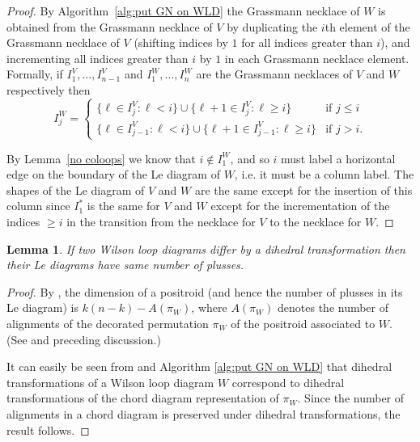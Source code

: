 \documentclass[11pt]{article}
\newtheorem{lem}[thm]{Lemma}
\theoremstyle{remark}
\theoremstyle{definition}
\begin{document}
\begin{proof}
  By Algorithm~\ref{alg:put GN on WLD} the Grassmann necklace of $W$ is obtained from the Grassmann necklace of $V$ by duplicating the $i$th element of the Grassmann necklace of $V$ (shifting indices by $1$ for all indices greater than $i$), and incrementing all indices greater than $i$ by $1$ in each Grassmann necklace element.  Formally, if $I_1^{V}, \ldots, I_{n-1}^{V}$ and $I_1^{W}, \ldots, I_n^{W}$ are the Grassmann necklaces of $V$ and $W$ respectively then
  \[
  I_j^{W} =
  \begin{cases}
    \{\ell \in I_j^{V} : \ell < i\} \cup \{\ell+1 \in I_j^{V} : \ell \geq i\} & \text{if $j\leq i$} \\
    \{\ell \in I_{j-1}^{V} : \ell < i\} \cup \{\ell+1 \in I_{j-1}^{V} : \ell \geq i\} & \text{if $j > i$.}
  \end{cases}
  \]


By Lemma~\ref{no coloops} we know that $i \not\in I_1^W$, and so $i$ must label a horizontal edge on the boundary of the Le diagram of $W$, i.e. it must be a column label. The shapes of the Le diagram of $V$ and $W$ are the same except for the insertion of this column since $I_1^*$ is the same for $V$ and $W$ except for the incrementation of the indices $\geq i$ in the transition from the necklace for $V$ to the necklace for $W$. 
\end{proof}


\begin{lem}\label{lem dihedral}
If two Wilson loop diagrams differ by a dihedral transformation then their Le diagrams have same number of plusses.
\end{lem}
\begin{proof}
By \cite[Proposition 17.10]{Postnikov}, the dimension of a positroid (and hence the number of plusses in its Le diagram) is $k(n-k) - A(\pi_W)$, where $A(\pi_W)$ denotes the number of alignments of the decorated permutation $\pi_W$ of the positroid associated to $W$. (See \cite[Figure 17.1]{Postnikov} and preceding discussion.)

It can easily be seen from \cite[Section 17]{Postnikov} and Algorithm \ref{alg:put GN on WLD} that dihedral transformations of a Wilson loop diagram $W$ correspond to dihedral transformations of the chord diagram representation of $\pi_W$. Since the number of alignments in a chord diagram is preserved under dihedral transformations, the result follows.
\end{proof}
\end{document}
